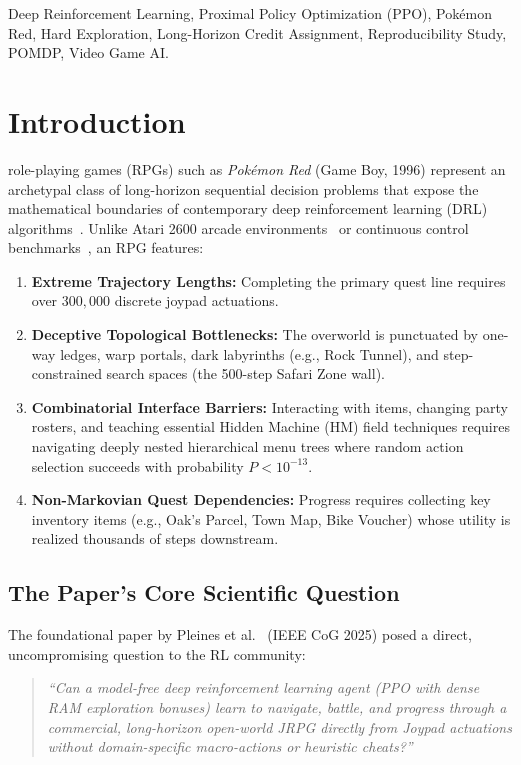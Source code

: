 \documentclass[conference]{IEEEtran}
\begin{document}
\begin{IEEEkeywords}
Deep Reinforcement Learning, Proximal Policy Optimization (PPO), Pok{\'e}mon Red, Hard Exploration, Long-Horizon Credit Assignment, Reproducibility Study, POMDP, Video Game AI.
\end{IEEEkeywords}

\section{Introduction}
 role-playing games (RPGs) such as \textit{Pok{\'e}mon Red} (Game Boy, 1996) represent an archetypal class of long-horizon sequential decision problems that expose the mathematical boundaries of contemporary deep reinforcement learning (DRL) algorithms~\cite{pleines2025playing, whidden2023pokemon}. Unlike Atari 2600 arcade environments~\cite{mnih2015human} or continuous control benchmarks~\cite{todorov2012mujoco}, an RPG features:
\begin{enumerate}
    \item \textbf{Extreme Trajectory Lengths:} Completing the primary quest line requires over $300{,}000$ discrete joypad actuations.
    \item \textbf{Deceptive Topological Bottlenecks:} The overworld is punctuated by one-way ledges, warp portals, dark labyrinths (e.g., Rock Tunnel), and step-constrained search spaces (the 500-step Safari Zone wall).
    \item \textbf{Combinatorial Interface Barriers:} Interacting with items, changing party rosters, and teaching essential Hidden Machine (HM) field techniques requires navigating deeply nested hierarchical menu trees where random action selection succeeds with probability $P < 10^{-13}$.
    \item \textbf{Non-Markovian Quest Dependencies:} Progress requires collecting key inventory items (e.g., Oak's Parcel, Town Map, Bike Voucher) whose utility is realized thousands of steps downstream.
\end{enumerate}

\subsection{The Paper's Core Scientific Question}
The foundational paper by Pleines et al.~\cite{pleines2025playing} (IEEE CoG 2025) posed a direct, uncompromising question to the RL community:
\begin{quote}
\textit{``Can a model-free deep reinforcement learning agent (PPO with dense RAM exploration bonuses) learn to navigate, battle, and progress through a commercial, long-horizon open-world JRPG directly from Joypad actuations without domain-specific macro-actions or heuristic cheats?''}
\end{quote}
\end{document}
